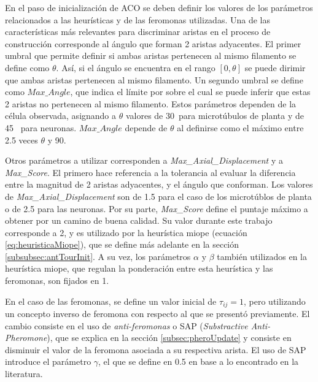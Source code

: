 En el paso de inicializaci\'on de ACO se deben definir los valores de los par\'ametros relacionados a las heur\'isticas y de las feromonas utilizadas. Una de las caracter\'isticas m\'as relevantes para discriminar aristas en el proceso de construcci\'on corresponde al \'angulo que forman 2 aristas adyacentes.
El primer umbral que permite definir si ambas aristas pertenecen al mismo filamento se define como $\theta$. As\'i, si el \'angulo se encuentra en el rango $[0, \theta]$ se puede dirimir que ambas aristas pertenecen al mismo filamento. Un segundo umbral se define como $Max\_Angle$, que indica el l\'imite por sobre el cual se puede inferir que estas 2 aristas no pertenecen al mismo filamento. Estos par\'ametros dependen de la c\'elula observada, asignando a $\theta$ valores de 30\textdegree ~para microt\'ubulos de planta y de 45\textdegree~ para neuronas. $Max\_Angle$ depende de $\theta$ al definirse como el m\'aximo entre 2.5 veces $\theta$ y 90\textdegree.

Otros par\'ametros a utilizar corresponden a {\it Max\_Axial\_Displacement} y a {\it Max\_Score}. El primero hace referencia a la tolerancia al evaluar la diferencia entre la magnitud de 2 aristas adyacentes, y el \'angulo que conforman. Los valores de {\it Max\_Axial\_Displacement} son de 1.5 para el caso de los microt\'ublos de planta o de 2.5 para las neuronas. Por su parte, {\it Max\_Score} define el puntaje m\'aximo a obtener por un camino de buena calidad. Su valor durante este trabajo corresponde a 2, y es utilizado por la heur\'istica miope (ecuaci\'on \ref{eq:heuristicaMiope}), que se define m\'as adelante en la secci\'on \ref{subsubsec:antTourInit}. A su vez, los par\'ametros $\alpha$ y $\beta$ tambi\'en utilizados en la heur\'istica miope, que regulan la ponderaci\'on entre esta heur\'istica y las feromonas, son fijados en 1.


En el caso de las feromonas, se define un valor inicial de $\tau_{ij} = 1$, pero utilizando un concepto inverso de feromona con respecto al que se present\'o previamente. El cambio consiste en el uso de {\it anti-feromonas} o SAP ({\it Substractive Anti-Pheromone})\cite{montgomery2002anti}, que se explica en la secci\'on \ref{subsec:pheroUpdate} y consiste en disminuir el valor de la feromona asociada a su respectiva arista. El uso de SAP introduce el par\'ametro $\gamma$, el que se define en 0.5 en base a lo encontrado en la literatura.


